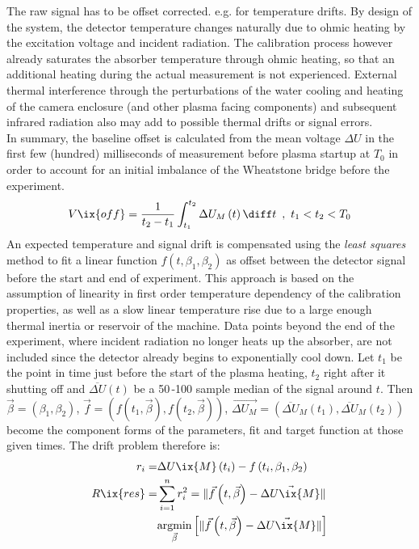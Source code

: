                 The raw signal has to be offset corrected. e.g. for temperature drifts. By design of the system, the detector temperature changes naturally due to ohmic heating by the excitation voltage and incident radiation. The calibration process however already saturates the absorber temperature through ohmic heating, so that an additional heating during the actual measurement is not experienced. External thermal interference through the perturbations of the water cooling and heating of the camera enclosure (and other plasma facing components) and subsequent infrared radiation also may add to possible thermal drifts or signal errors.\\%
                In summary, the baseline offset is calculated from the mean voltage $\Delta U$ in the first few (hundred) milliseconds of measurement before plasma startup at $T_{0}$ in order to account for an initial imbalance of the Wheatstone bridge before the experiment.%
%
                \begin{align}%
                    V\ix{off}=\frac{1}{t_{2}-t_{1}}\int_{t_{1}}^{t_{2}}\Delta U_{M}\left(t\right)\diff t\,\,\,,\,\,t_{1}<t_{2}<T_{0}\label{eq:offset}
                \end{align}%
%
                An expected temperature and signal drift is compensated using the \textit{least squares} method to fit a linear function $f\left(t, \beta_{1}, \beta_{2}\right)$ as offset between the detector signal before the start and end of experiment. This approach is based on the assumption of linearity in first order temperature dependency of the calibration properties, as well as a slow linear temperature rise due to a large enough thermal inertia or reservoir of the machine. Data points beyond the end of the experiment, where incident radiation no longer heats up the absorber, are not included since the detector already begins to exponentially cool down. Let $t_{1}$ be the point in time just before the start of the plasma heating, $t_{2}$ right after it shutting off and $\overline{\Delta U}\left(t\right)$ be a 50\,-100 sample median of the signal around $t$. Then $\vec{\beta}=\left(\beta_{1}, \beta_{2}\right)$, $\vec{f}=\left(f\left(t_{1},\vec{\beta}\right), f\left(t_{2}, \vec{\beta}\right)\right)$, $\vec{\Delta U_{M}}=\left(\overline{\Delta U}_{M}\left(t_{1}\right), \overline{\Delta U}_{M}\left(t_{2}\right)\right)$ become the component forms of the parameters, fit and target function at those given times. The drift problem therefore is:%
%
                \begin{align}%
                    \begin{split}\label{eq:linear_fit}%
                        r_{i}=&\Delta U\ix{M}\left(t_{i}\right)-f\left(t_{i},\beta_{1}, \beta_{2}\right)\\%
                        R\ix{res}=&\sum_{i=1}^{n}r_{i}^{2}=\|\vec{f}\left(t, \vec{\beta}\right)-\vec{\Delta U\ix{M}}\|\\%
                        &\underset{\vec{\beta}}{\text{argmin}}\left[\|\vec{f}\left(t, \vec{\beta}\right)-\vec{\Delta U\ix{M}}\|\right]%
                    \end{split}%
                \end{align}%
